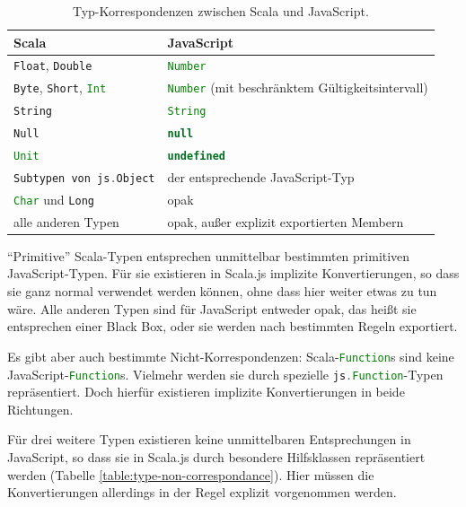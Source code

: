 \documentclass[a4paper, 12pt, hidelinks, listof=totoc, listoftables=totoc, bibliography=totoc]{scrreprt}
\newcommand{\scala}[1]{\lstinline[language=Scala, style=inline]|#1|}
\newcommand{\js}[1]{\lstinline[language=JavaScript, style=inline]|#1|}
\begin{document}
\medskip

\begin{table}[!h]
\begin{tabular}{|l|l|}
\hline \textbf{Scala}                           & \textbf{JavaScript} \\ 
\hline \scala{Float}, \scala{Double}            & \js{Number} \\ 
\hline \scala{Byte}, \scala{Short}, \scala{Int} & \js{Number} (mit beschränktem Gültigkeitsintervall) \\ 
\hline \scala{String}                           & \js{String} \\ 
\hline \scala{Null}                             & \js{null} \\ 
\hline \scala{Unit}                             & \js{undefined} \\ 
\hline \scala{Subtypen von js.Object}           & der entsprechende JavaScript-Typ \\ 
\hline \scala{Char} und \scala{Long}            & opak \\ 
\hline alle anderen Typen                       & opak, außer explizit exportierten Membern \\ 
\hline 
\end{tabular}
\caption{Typ-Korrespondenzen zwischen Scala und JavaScript. \cite[S. 13]{doeraene2014.WHB}}
\label{table:type-correspondance}
\end{table}

\medskip

"`Primitive"' Scala-Typen entsprechen unmittelbar bestimmten primitiven JavaScript-Typen. Für sie existieren in Scala.js implizite Konvertierungen, so dass sie ganz normal verwendet werden können, ohne dass hier weiter etwas zu tun wäre. Alle anderen Typen sind für JavaScript entweder opak, das heißt sie entsprechen einer Black Box, oder sie werden nach bestimmten Regeln exportiert.

Es gibt aber auch bestimmte Nicht-Korrespondenzen: Scala-\scala{Function}s sind keine JavaScript-\js{Function}s. Vielmehr werden sie durch spezielle \scala{js.Function}-Typen repräsentiert. Doch hierfür existieren implizite Konvertierungen in beide Richtungen.

Für drei weitere Typen existieren keine unmittelbaren Entsprechungen in JavaScript, so dass sie in Scala.js durch besondere Hilfsklassen repräsentiert werden (Tabelle \ref{table:type-non-correspondance}). Hier müssen die Konvertierungen allerdings in der Regel explizit vorgenommen werden.
\end{document}
